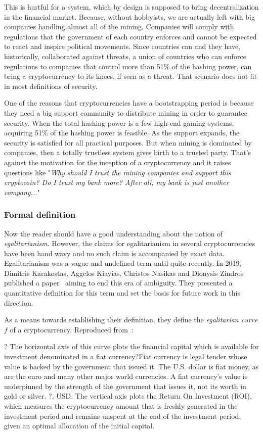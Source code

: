 This is hurtful for a system, which by design is supposed to bring decentralization in the financial market. Because, without hobbyists, we are actually left with big companies handling almost all of the mining. Companies will comply with regulations that the government of each country enforces and cannot be expected to react and inspire political movements. Since countries can and they have, historically, collaborated against threats, a union of countries who can enforce regulations to companies that control more than 51\% of the hashing power, can bring a cryptocurrency to its knees, if seen as a threat. That scenario does not fit in most definitions of security.

One of the reasons that cryptocurrencies have a bootstrapping period is because they need a big support community to distribute mining in order to guarantee security. When the total hashing power is a few high-end gaming systems, acquiring 51\% of the hashing power is feasible. As the support expands, the security is satisfied for all practical purposes. But when mining is dominated by companies, then a totally trustless system gives birth to a trusted party. That's against the motivation for the inception of a cryptocurrency and it raises questions like "\emph{Why should I trust the mining companies and support this cryptocoin? Do I trust my bank more? After all, my bank is just another company...}"

\subsubsection{Formal definition}
Now the reader should have a good understanding about the notion of \emph{egalitarianism}. However, the claims for egalitarianism in several cryptocurrencies have been hand wavy and no such claim is accompanied by exact data. Egalitarianism was a vague and undefined term until quite recently. In 2019, Dimitris Karakostas, Aggelos Kiayias, Christos Nasikas and Dionysis Zindros published a paper~\cite{egalitarianism} aiming to end this era of ambiguity. They presented a quantitative definition for this term and set the basis for future work in this direction.

As a means towards establishing their definition, they define the \emph{egalitarian curve} $f$ of a cryptocurrency. Reproduced from~\cite{egalitarianism}:
\begin{fverbatim}{?}
  The horizontal axis of this curve plots the financial capital
  which is available for investment denominated in a fiat
  currency?Fiat currency is legal tender whose value is backed by the government that issued it. The U.S. dollar is fiat money, as are the euro and many other major world currencies. A fiat currency's value is underpinned by the strength of the government that issues it, not its worth in gold or silver. ?, USD. The vertical axis plots the Return On
  Investment (ROI), which measures the cryptocurrency amount that
  is freshly generated in the investment period and remains
  unspent at the end of the investment period, given an optimal
  allocation of the initial capital.
\end{fverbatim}

